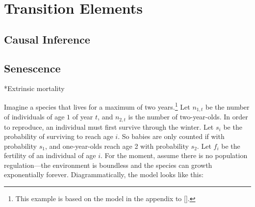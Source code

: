 \documentclass[10pt,reqno]{amsbook}
\makeatletter
\renewcommand\section{\@startsection{section}{1}
\z@{.7\linespacing\@plus\linespacing}{.5\linespacing}
{\large\bfseries\itshape}}
\numberwithin{equation}{chapter}
\makeatother
\begin{document}
\part{Transition Elements}




\setcounter{chapter}{6}
\def \chapterElement {Ki}
\chapter{Causal Inference}


\lipsum[2-4]




\setcounter{chapter}{10}
\def \chapterElement {Se}
\chapter{Senescence}


\lipsum[2-4]

\section*{Extrinsic mortality}

Imagine a species that lives for a maximum of two years.\footnote{This example is based on the model in the appendix to [].} Let $n_{1,t}$ be the number of individuals of age $1$ of year $t$, and $n_{2,t}$ is the number of two-year-olds. In order to reproduce, an individual must first survive through the winter. Let $s_i$ be the probability of surviving to reach age $i$. So babies are only counted if with probability $s_1$, and one-year-olds reach age 2 with probability $s_2$. Let $f_i$ be the fertility of an individual of age $i$. For the moment, assume there is no population regulation---the environment is boundless and the species can growth exponentially forever. Diagrammatically, the model looks like this:
\end{document}
